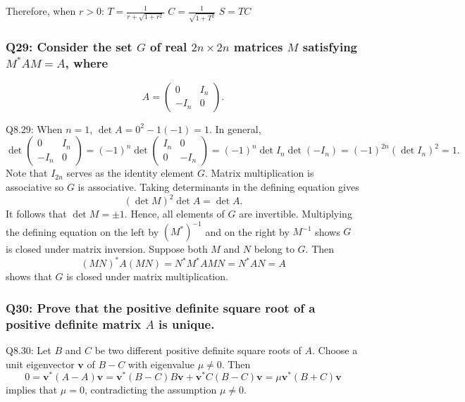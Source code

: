 \documentclass[8pt]{article}
\begin{document}
{Therefore, when $r > 0$:
$T = \frac{1}{r + \sqrt{1 + r^2}}$
$C = \frac{1}{\sqrt{1 + T^2}}$
$S = TC$

\subsubsection*{Q29: Consider the set \(G\) of real \(2n \times 2n\) matrices \(M\) satisfying \(M^*AM = A\), where}

\[ A = \begin{pmatrix} 0 & I_n \\ -I_n & 0 \end{pmatrix}. \]


Q8.29: When \( n = 1 \), \( \det A = 0^2 - 1(-1) = 1 \). In general,
\[
\det \begin{pmatrix}
0 & I_n \\
-I_n & 0
\end{pmatrix}
= (-1)^n \det \begin{pmatrix}
I_n & 0 \\
0 & -I_n
\end{pmatrix}
= (-1)^n \det I_n \det(-I_n)
= (-1)^{2n} (\det I_n)^2
= 1.
\]
Note that \( I_{2n} \) serves as the identity element \( G \). Matrix multiplication is associative so \( G \) is associative. Taking determinants in the defining equation gives
\[
(\det M)^2 \det A = \det A.
\]
It follows that \( \det M = \pm 1 \). Hence, all elements of \( G \) are invertible. Multiplying the defining equation on the left by \( (M^*)^{-1} \) and on the right by \( M^{-1} \) shows \( G \) is closed under matrix inversion. Suppose both \( M \) and \( N \) belong to \( G \). Then
\[
(MN)^* A (MN) = N^* M^* A MN = N^* AN = A
\]
shows that \( G \) is closed under matrix multiplication.

\subsubsection*{Q30: Prove that the positive definite square root of a positive definite matrix \(A\) is unique.}

Q8.30: Let \( B \) and \( C \) be two different positive definite square roots of \( A \). Choose a unit eigenvector \( \mathbf{v} \) of \( B - C \) with eigenvalue \( \mu \neq 0 \). Then
\[
0 = \mathbf{v}^*(A - A)\mathbf{v}
= \mathbf{v}^*(B - C)B\mathbf{v} + \mathbf{v}^*C(B - C)\mathbf{v}
= \mu \mathbf{v}^*(B + C)\mathbf{v}
\]
implies that \( \mu = 0 \), contradicting the assumption \( \mu \neq 0 \).

}
\end{document}
